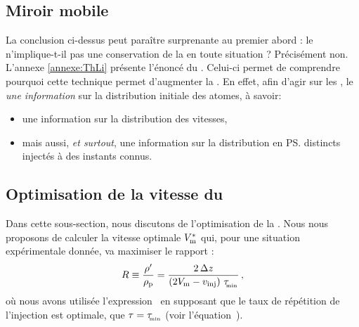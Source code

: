 
\subsection{Miroir mobile \emph{}}

La conclusion ci-dessus peut paraître surprenante au premier abord :
le \thLi n'implique-t-il pas une conservation de la \ddedpup en toute situation ?  Précisément non. L'annexe \vref{annexe:ThLi} présente l'énoncé du \thLi. Celui-ci permet de comprendre pourquoi cette technique permet d'augmenter la \ddedpup.
En effet, afin d'agir sur les \patss, le \mimo \emph{ une information} sur la distribution initiale des atomes, à savoir:
\begin{itemize}
	\item une information sur la distribution des vitesses,
	\item mais aussi, \emph{et surtout}, une information sur la distribution en \ps distincts injectés à des instants connus.
\end{itemize}
%
%
%
%
%
\RemonteUneLigne
%
\subsection{Optimisation de la vitesse du \mi}
%
Dans cette sous-section, nous discutons de l'optimisation de la \techmimo. Nous nous proposons de calculer la vitesse optimale ${V_{\rm {m}}^\ast}$ %
%
qui, pour une situation expérimentale donnée, va maximiser le rapport :
\begin{equation}
	\Rmax \equiv \dfrac{\rhomoym}{\rhomoyp} 
	=\frac{\DeltaZPaquet}{\left(2\Vmir-\vinj\right)\,\Trepmin}
	\virguleformule
	\label{eq:Rmax}
\end{equation}%
%
où nous avons utilisée l'expression~ en supposant que le taux de répétition de l'injection est optimale, \cad que $\tau={\tau_{_{\hspace{-2pt} \rm min}}}$ (voir l'équation~). 

